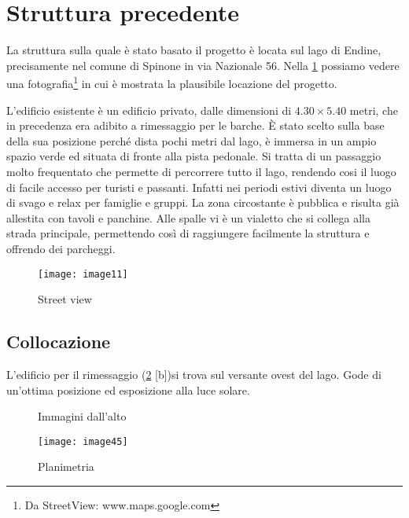 \section{Struttura precedente}

La struttura sulla quale è stato basato il progetto è locata sul lago di Endine,  precisamente nel comune di Spinone in via Nazionale 56. Nella \cref{fig:streetview} possiamo vedere una fotografia\footnote{Da StreetView: www.maps.google.com} in cui è mostrata la plausibile locazione del progetto.

L'edificio esistente è un edificio privato, dalle dimensioni di $4.30 \times 5.40$ metri, che in precedenza era adibito a rimessaggio per le barche.  È stato scelto sulla base della sua posizione perché dista pochi metri dal lago, è immersa in un ampio spazio verde  ed situata di fronte alla pista pedonale. Si tratta di un passaggio molto frequentato  che permette di percorrere tutto il lago, rendendo cosi il luogo di facile accesso per turisti e passanti. Infatti nei periodi estivi diventa un luogo di svago e relax per famiglie e gruppi. La zona circostante è pubblica e risulta già allestita con tavoli e panchine. Alle spalle vi è un vialetto  che si collega alla strada principale, permettendo così di raggiungere facilmente la struttura e offrendo dei parcheggi.

\begin{figure}[H]
	\centering
	\texttt{[image: image11]}
	\caption{Street view}
	\label{fig:streetview}
\end{figure}

\clearpage
\subsection{Collocazione}

L'edificio per il rimessaggio (\cref{fig:rimessaggio} [b])si trova sul versante ovest del lago. Gode di un'ottima posizione ed esposizione alla luce solare.

\begin{figure}[H]
	\captionsetup[subfloat]{farskip=2pt,captionskip=8pt}
	\centering
	\hspace{1cm}
	
	\caption{Immagini dall'alto}
	\label{fig:rimessaggio}
\end{figure}

\begin{figure}[H]
	\centering
	\texttt{[image: image45]}
	\caption{Planimetria} 
	\label{fig:mesh1}
\end{figure}